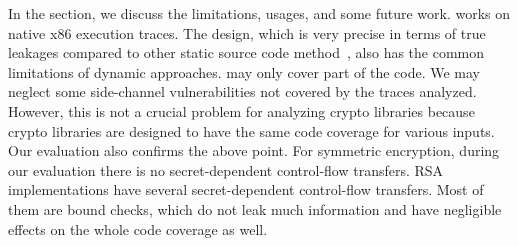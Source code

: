 In the section, we discuss the limitations, usages, and some future work. 
%
\tool{} works on native x86 execution traces. The design, which is very
precise in terms of true leakages compared to other static source code
method~\cite{197207,BacelarAlmeida:2013:FVS:2483313.2483334}, also has 
the common limitations of dynamic approaches. \tool{} may only cover part of the code.
We may 
neglect some side-channel vulnerabilities not covered by the traces analyzed.
However, this is not a crucial problem for analyzing crypto libraries because crypto
libraries are designed to have the same code coverage for various inputs. Our
evaluation also confirms the above point. For symmetric encryption, during our
evaluation there is no secret-dependent control-flow transfers. RSA
implementations have several secret-dependent control-flow transfers. 
Most of them are  %
bound checks, which do not leak much information and have negligible effects
on the whole code coverage as well.
